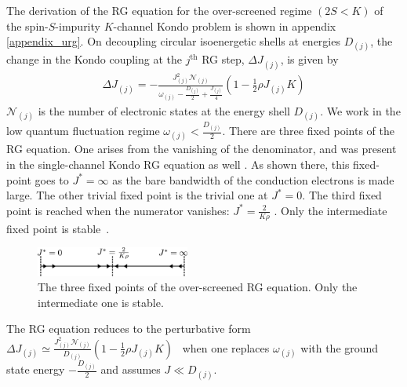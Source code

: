 \documentclass[reprint,prb,superscriptaddress]{revtex4-2}
\begin{document}
The derivation of the RG equation for the over-screened regime \((2S < K)\) of the spin-\(S\)-impurity \(K\)-channel Kondo problem is shown in appendix \ref{appendix_urg}. On decoupling circular isoenergetic shells at energies \(D_{(j)}\), the change in the Kondo coupling at the \(j^\text{th}\) RG step, \(\Delta J_{(j)}\), is given by
\begin{equation}\begin{aligned}
	\Delta J_{(j)} = -\frac{J_{(j)}^2 \mathcal{N}_{(j)}}{\omega_{(j)} - \frac{D_{(j)}}{2} + \frac{J_{(j)}}{4}}\left( 1 - \frac{1}{2}\rho J_{(j)} K \right) 
\end{aligned}\end{equation}
\(\mathcal{N}_{(j)}\) is the number of electronic states at the energy shell \(D_{(j)}\). We work in the low quantum fluctuation regime \(\omega_{(j)} < \frac{D_{(j)}}{2}\). There are three fixed points of the RG equation. One arises from the vanishing of the denominator, and was present in the single-channel Kondo RG equation as well \cite{kondo_urg}. As shown there, this fixed-point goes to \(J^* = \infty\) as the bare bandwidth of the conduction electrons is made large. The other trivial fixed point is the trivial one at \(J^* = 0\). The third fixed point is reached when the numerator vanishes: \(J^* = \frac{2}{K \rho}\) \cite{Kogan_2018,Kuramoto1998,Noz_blandin_1980}. Only the intermediate fixed point is stable~\cite{affleck_1991_overscreen,Tsvelick_Weigmann_mchannel_1984,Gan_mchannel_1994,pang_cox_1991,emery_kivelson,vondelft_prl_1998}.
\begin{figure}[htpb]
	\centering
	\includegraphics[width=0.45\textwidth]{./rg_flow.pdf}
	\caption{The three fixed points of the over-screened RG equation. Only the intermediate one is stable.}
	\label{rg_flow}
\end{figure}

The RG equation reduces to the perturbative form \(\Delta J_{(j)} \simeq \frac{J_{(j)}^2 \mathcal{N}_{(j)}}{D_{(j)}}\left( 1 - \frac{1}{2}\rho J_{(j)} K \right)\)~\cite{Kogan_2018,Kuramoto1998,Noz_blandin_1980,tripathi2018landau} when one replaces \(\omega_{(j)}\) with the ground state energy \(-\frac{D_{(j)}}{2}\) and assumes \(J \ll D_{(j)}\).
\end{document}
